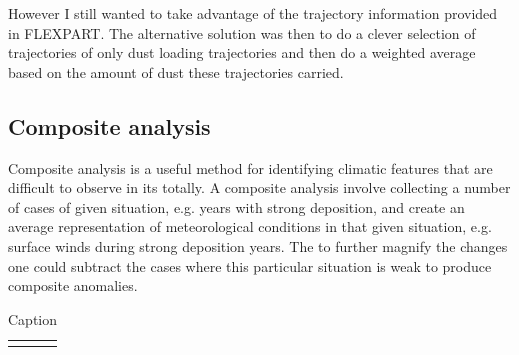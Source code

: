 However I still wanted to take advantage of the trajectory information provided in FLEXPART. The alternative solution was then to do a clever selection of trajectories of only dust loading trajectories and then do a weighted average based on the amount of dust these trajectories carried.  

\subsection{Composite analysis}

Composite analysis is a useful method for identifying climatic features that are difficult to observe in its totally. A composite analysis involve collecting a number of cases of given situation, e.g. years with strong deposition, and create an average representation of meteorological conditions in that given situation, e.g. surface winds during strong deposition years. The to further magnify the changes one could subtract the cases where this particular situation is weak to produce composite anomalies.      





\begin{table}[]
    \caption{Caption}
    \label{tab:my_label}
    \centering
    \begin{tabular}{@{}ll@{}} 
    \toprule
         &  \\ \midrule
         
         & 
    \end{tabular}

\end{table}